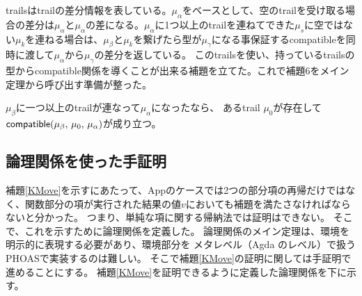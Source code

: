 trailsはtrailの差分情報を表している。$\mu_{\alpha}$をベースとして、空のtrailを受け取る場合の差分は$\mu_{\alpha}$と$\mu_{\alpha}$の差になる。$\mu_{\alpha}$に1つ以上のtrailを連ねてできた$\mu_s$に空ではない$\mu_k$を連ねる場合は、$\mu_{\beta}$と$\mu_k$を繋げたら型が$\mu_{\gamma}$になる事保証する\textsf{compatible}を同時に渡して$\mu_{\alpha}$から$\mu_{\gamma}$の差分を返している。
このtrailsを使い、持っているtrailsの型から\textsf{compatible}関係を導くことが出来る補題を立てた。これで補題6をメイン定理から呼び出す準備が整った。
\begin{lemma}\upshape
  $\mu_{\beta}$に一つ以上のtrailが連なって$\mu_{\alpha}$になったなら、
 あるtrail $\mu_0$が存在して
 $\textsf{compatible}(\mu_{\beta},\,\mu_0,\,\mu_{\alpha})$が成り立つ。
\end{lemma}


\subsection{論理関係を使った手証明}
補題\ref{KMove}を示すにあたって、Appのケースでは2つの部分項の再帰だけではなく、関数部分の項が実行された結果の値$v$においても補題を満たさなければならないと分かった。
つまり、単純な項に関する帰納法では証明はできない。
そこで、これを示すために論理関係を定義した。
論理関係のメイン定理は、環境を明示的に表現する必要があり、環境部分を
メタレベル（Agda のレベル）で扱うPHOASで実装するのは難しい。
そこで補題\ref{KMove}の証明に関しては手証明で進めることにする。
補題\ref{KMove}を証明できるように定義した論理関係を下に示す。

